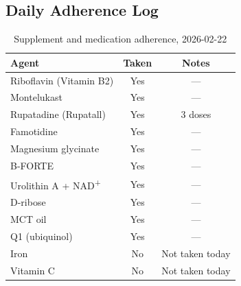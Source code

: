 \subsection{Daily Adherence Log}
\label{subsec:adherence-log}

\begin{table}[h]
\centering
\caption{Supplement and medication adherence, 2026-02-22}
\label{tab:adherence-2026-02-22}
\begin{tabular}{lcc}
\toprule
Agent & Taken & Notes \\
\midrule
Riboflavin (Vitamin B2)      & Yes & --- \\
Montelukast                  & Yes & --- \\
Rupatadine (Rupatall)        & Yes & 3 doses \\
Famotidine                   & Yes & --- \\
Magnesium glycinate          & Yes & --- \\
B-FORTE                      & Yes & --- \\
Urolithin A + NAD\textsuperscript{+} & Yes & --- \\
D-ribose                     & Yes & --- \\
MCT oil                      & Yes & --- \\
Q1 (ubiquinol)               & Yes & --- \\
Iron                         & No  & Not taken today \\
Vitamin C                    & No  & Not taken today \\
\bottomrule
\end{tabular}
\end{table}

